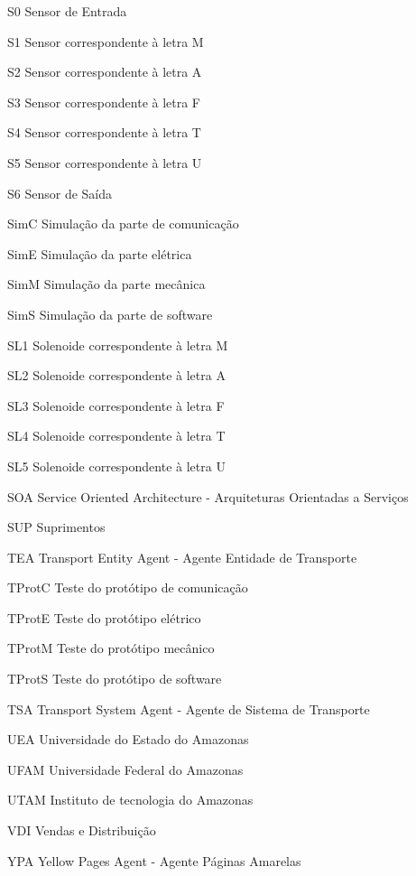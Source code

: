 \documentclass[
12pt,				%
openright,			%
oneside,			%
a4paper,			%
english,			%
brazil				%
]{abntex2}
\begin{document}
\begin{siglas}
\item[S0] Sensor de Entrada
\item[S1] Sensor correspondente à letra M
\item[S2] Sensor correspondente à letra A
\item[S3] Sensor correspondente à letra F
\item[S4] Sensor correspondente à letra T
\item[S5] Sensor correspondente à letra U
\item[S6] Sensor de Saída
\item[SimC] Simulação da parte de comunicação
\item[SimE] Simulação da parte elétrica
\item[SimM] Simulação da parte mecânica
\item[SimS] Simulação da parte de software
\item[SL1] Solenoide correspondente à letra M
\item[SL2] Solenoide correspondente à letra A
\item[SL3] Solenoide correspondente à letra F
\item[SL4] Solenoide correspondente à letra T
\item[SL5] Solenoide correspondente à letra U
\item[SOA] Service Oriented Architecture - Arquiteturas Orientadas a Serviços
\item[SUP] Suprimentos
\item[TEA] Transport Entity Agent - Agente Entidade de Transporte
\item[TProtC] Teste do protótipo de comunicação
\item[TProtE] Teste do protótipo elétrico
\item[TProtM] Teste do protótipo mecânico
\item[TProtS] Teste do protótipo de software
\item[TSA ]Transport System Agent - Agente de Sistema de Transporte
\item[UEA] Universidade do Estado do Amazonas
\item[UFAM] Universidade Federal do Amazonas
\item[UTAM] Instituto de tecnologia do Amazonas
\item[VDI] Vendas e Distribuição
\item[YPA] Yellow Pages Agent - Agente Páginas Amarelas

\end{siglas}
\tableofcontents*
\cleardoublepage
\mainmatter







%
\end{document}
